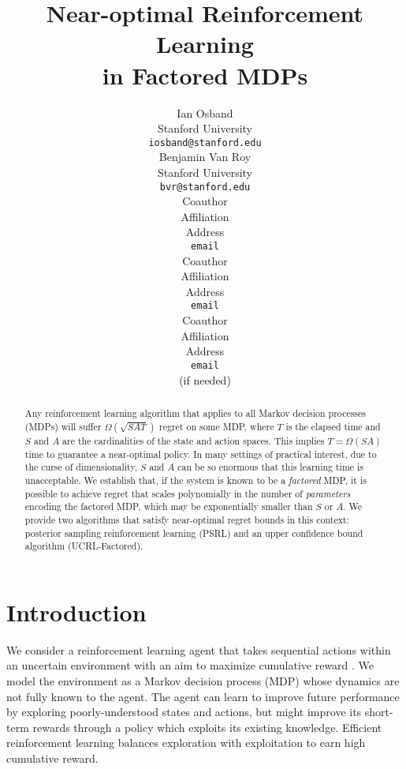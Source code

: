 \documentclass{article}
\title{Near-optimal Reinforcement Learning \\ in Factored MDPs}
\author{
Ian Osband \\
Stanford University\\
\texttt{iosband@stanford.edu} \\
\And
Benjamin Van Roy \\
Stanford University \\
\texttt{bvr@stanford.edu} \\
\AND
Coauthor \\
Affiliation \\
Address \\
\texttt{email} \\
\And
Coauthor \\
Affiliation \\
Address \\
\texttt{email} \\
\And
Coauthor \\
Affiliation \\
Address \\
\texttt{email} \\
(if needed)\\
}
\begin{document}
\maketitle


\begin{abstract}
Any reinforcement learning algorithm that applies to all Markov decision processes (MDPs) will suffer $\Omega(\sqrt{SAT})$ regret on some MDP, where $T$ is the elapsed time and $S$ and $A$ are the cardinalities of the state and action spaces.
This implies $T = \Omega(SA)$ time to guarantee a near-optimal policy.
In many settings of practical interest, due to the curse of dimensionality, $S$ and $A$ can be so enormous that this learning time is unacceptable.
We establish that, if the system is known to be a \emph{factored} MDP, it is possible to achieve regret that scales polynomially in the number of \emph{parameters} encoding the factored MDP, which may be exponentially smaller than $S$ or $A$.
We provide two algorithms that satisfy near-optimal regret bounds in this context:
posterior sampling reinforcement learning (PSRL) and an upper confidence bound algorithm (UCRL-Factored).
\end{abstract}


\section{Introduction}

We consider a reinforcement learning agent that takes sequential actions within an uncertain environment with an aim to maximize cumulative reward \cite{burnetas1997optimal}.
We model the environment as a Markov decision process (MDP) whose dynamics are not fully known to the agent.
The agent can learn to improve future performance by exploring poorly-understood states and actions, but might improve its short-term rewards through a policy which exploits its existing knowledge.
Efficient reinforcement learning balances exploration with exploitation to earn high cumulative reward.
\end{document}
